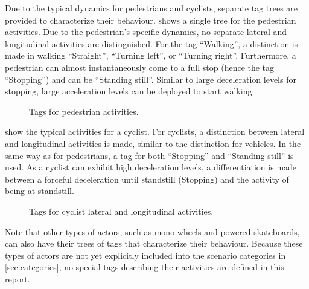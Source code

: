 Due to the typical dynamics for pedestrians and cyclists, separate tag trees are provided to characterize their behaviour.  shows a single tree for the pedestrian activities. Due to the pedestrian's specific dynamics, no separate lateral and longitudinal activities are distinguished.
For the tag ``Walking'', a distinction is made in walking ``Straight'', ``Turning left'', or ``Turning right''. Furthermore, a pedestrian can almost instantaneously come to a full stop (hence the tag ``Stopping'') and can be ``Standing still''. Similar to large deceleration levels for stopping, large acceleration levels can be deployed to start walking. 
\begin{figure}
	\centering
	\caption{Tags for pedestrian activities.}
	\label{fig:tree pedestrian act}
\end{figure}

 show the typical activities for a cyclist. For cyclists, a distinction between lateral and longitudinal activities is made, similar to the distinction for vehicles. In the same way as for pedestrians, a tag for both ``Stopping'' and ``Standing still'' is used. As a cyclist can exhibit high deceleration levels, a differentiation is made between a forceful deceleration until standstill (Stopping) and the activity of being at standstill.

\begin{figure}
	\centering
	\begin{subfigure}{\linewidth}
		\centering
		\caption{\vspace{0.5cm}}
		\label{fig:tree cyclist lat act}
	\end{subfigure}
	\begin{subfigure}{\linewidth}
		\centering
		\caption{}
		\label{fig:tree cyclist long act}
	\end{subfigure}
	\caption{Tags for cyclist lateral and longitudinal activities.}
\end{figure}

Note that other types of actors, such as mono-wheels and powered skateboards, can also have their trees of tags that characterize their behaviour. Because these types of actors are not yet explicitly included into the scenario categories in \cref{sec:categories}, no special tags describing their activities are defined in this report.

